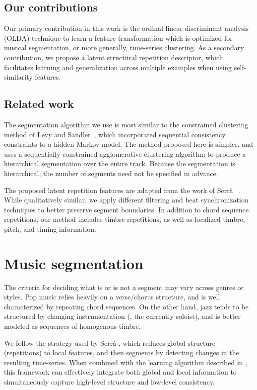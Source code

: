 \documentclass{article}
\begin{document}
\subsection{Our contributions}
Our primary contribution in this work is the ordinal linear discriminant analysis (OLDA) technique to learn a 
feature transformation which is optimized for musical segmentation, or more generally, time-series clustering.
As a secondary contribution, we propose a latent structural repetition descriptor, which facilitates learning and
generalization across multiple examples when using self-similarity features.

\subsection{Related work}
\label{sec:related}

The segmentation algorithm we use is most similar to the constrained clustering method of Levy and
Sandler~\cite{levy2008structural}, which incorporated sequential consistency constraints to a hidden Markov model. 
The method proposed here is simpler, and uses a sequentially constrained agglomerative clustering algorithm to 
produce a hierarchical segmentation over the entire track.  
Because the segmentation is hierarchical, the number of segments need not be specified in advance.

The proposed latent repetition features are adapted from the work of Serr\`{a}
\etal~\cite{serra2012unsupervised}. While qualitatively similar, we apply different filtering and
beat synchronization techniques to better preserve segment boundaries. 
In addition to chord sequence repetitions, our method includes timbre repetitions, as well as 
localized timbre, pitch, and timing information.

\section{Music segmentation}
\label{sec:features}
The criteria for deciding what is or is not a segment may vary across genres or styles.  
Pop music relies heavily on a verse/chorus structure, and is well characterized by repeating chord sequences. 
On the other hand, jazz tends to be structured by changing instrumentation (\ie, the currently soloist),
and is better modeled as sequences of homogenous timbre.

We follow the strategy used by Serr\`{a} \etal, which reduces global structure (repetitions) to
local features, and then segments by detecting changes in the resulting time-series. 
When combined with the learning algorithm described in , this framework can effectively integrate both 
global and local information to simultaneously capture high-level structure and low-level consistency.
\end{document}
